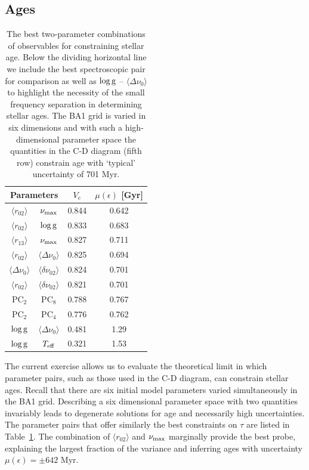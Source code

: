 \subsection{Ages}
\label{sec:sages}
\begin{table}
\centering
\caption{The best two-parameter combinations of observables for constraining stellar age. Below the dividing horizontal line we include the best spectroscopic pair for comparison as well as $\log \rm{g}$ -- $\langle\Delta\nu_0\rangle$ to highlight the necessity of the small frequency separation in determining stellar ages. The BA1 grid is varied in six dimensions and with such a high-dimensional parameter space the quantities in the C-D diagram (fifth row) constrain age with `typical' uncertainty of 701 Myr.}
    \begin{tabular}{cccc}
    \hline \hline
\multicolumn{2}{c}{Parameters} & $V_e$ & $\mu (\epsilon)$ [Gyr] \\ \hline 
$\langle r_{02}\rangle$     & $\nu_{\rm{max}}$               &0.844  & 0.642\\
$\langle r_{02}\rangle$     & $\log \rm{g}$                  &0.833  & 0.683\\
$\langle r_{13}\rangle$     &$\nu_{\rm{max}}$                &0.827  & 0.711\\
$\langle r_{02}\rangle$     & $\langle\Delta\nu_0\rangle$    &0.825  & 0.694\\
$\langle\Delta\nu_0\rangle$ &$\langle\delta\nu_{02}\rangle$  &0.824  & 0.701\\
$\langle r_{02}\rangle$     & $\langle\delta\nu_{02}\rangle$ &0.821  & 0.701\\
PC$_2$ & PC$_8$ & 0.788 & 0.767 \\
PC$_2$ & PC$_4$ & 0.776 & 0.762 \\
\hline
 $\log \rm{g}$ & $\langle\Delta\nu_0\rangle$ & 0.481 & 1.29 \\
 $\log \rm{g}$ & $T_{\rm{eff}}$ & 0.321 & 1.53 \\
 \hline
    \end{tabular}
    \label{tab:cd}
\end{table}
The current exercise allows us to evaluate the theoretical limit in which parameter pairs, such as those used in the C-D diagram, can constrain stellar ages. 
Recall that there are six initial model parameters varied simultaneously in the BA1 grid. 
Describing a six dimensional parameter space with two quantities invariably leads to degenerate solutions for age and necessarily high uncertainties.
The parameter pairs that offer similarly the best constraints on $\tau$ are listed in Table~\ref{tab:cd}. The combination of $\langle r_{02}\rangle$ and $\nu_{\rm{max}}$  marginally provide the best probe, explaining the largest fraction of the variance and inferring ages with uncertainty $\mu (\epsilon) = \pm 642$ Myr.  
